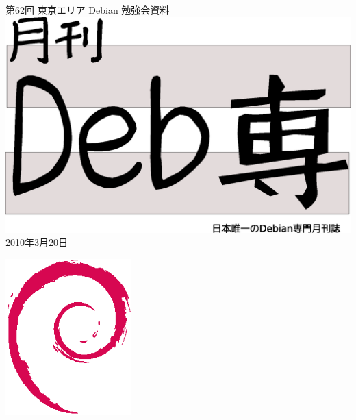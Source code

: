 \documentclass[mingoth,a4paper]{jsarticle}
\newcommand{\debmtgyear}{2010}
\newcommand{\debmtgmonth}{3}
\newcommand{\debmtgdate}{20}
\newcommand{\debmtgnumber}{62}
\begin{document}
\begin{titlepage}
\thispagestyle{empty}


\vspace*{-2cm}
第\debmtgnumber{}回 東京エリア Debian 勉強会資料\\
\hspace*{-2cm}
\includegraphics[width=210mm]{image201003/debsen.eps}\\
\hfill{}\debmtgyear{}年\debmtgmonth{}月\debmtgdate{}日



\vspace*{-2cm}
\hfill{}\includegraphics[height=6cm]{image200502/openlogo-nd.eps}
\end{titlepage}

\end{document}
